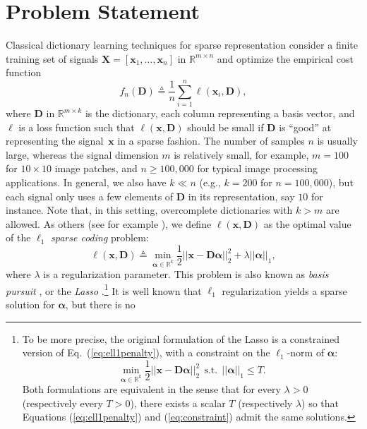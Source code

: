 \documentclass[twoside,11pt]{article}
\def\x{{\mathbf x}}
\def\l{{\ell}}
\def\X{{\mathbf X}}
\def\alphab{{\boldsymbol\alpha}}
\def\D{{\mathbf D}}
\def\Real{{\mathbb R}}
\def\st{~~\text{s.t.}~~}
\def\defin{\stackrel{\vartriangle}{=}}
\begin{document}
\section{Problem Statement} \label{sec:diclearn} 
Classical dictionary learning techniques for sparse representation \citep{field,engan,lewicki,aharon,lee}
consider a finite training set of signals $\X = [\x_1,\ldots,\x_n]$ in $\Real^{m \times n}$ 
and optimize the empirical cost function
\begin{equation}
   f_n(\D) \defin \frac{1}{n} \sum_{i=1}^n \l(\x_i,\D), \label{eq:empirical}
\end{equation}
where $\D$ in $\Real^{m \times k}$ is the dictionary, each column
representing a basis vector, and $\l$ is a loss function such that
$\l(\x,\D)$ should be small if $\D$ is ``good'' at representing the
signal~$\x$ in a sparse fashion. The number of samples
$n$ is usually large, whereas the signal dimension $m$ is relatively
small, for example, $m = 100$ for $10 \times 10$ image patches, and $n
\geq 100, 000$ for typical image processing applications.  In general,
we also have $k \ll n$ (e.g., $k=200$ for $n=100, 000$), but each
signal only uses a few elements of $\D$ in its representation, say
$10$ for instance. Note that, in this setting, overcomplete dictionaries with $k >
m$ are allowed. As others (see for example \citealp{lee}), we define
$\l(\x,\D)$ as the optimal value of the $\ell_1$ {\em sparse coding}
problem:
\begin{equation}
   \l(\x,\D) \defin \min_{\alphab \in \Real^k} \frac{1}{2}||\x-\D\alphab||_2^2 +
   \lambda ||\alphab||_1,\label{eq:ell1penalty}
\end{equation}
where $\lambda$ is a regularization parameter. 
This problem is also known as {\em basis pursuit} \citep{chen}, or the {\em
Lasso} \citep{tibshirani}.\footnote{To be more precise, the original formulation
of the Lasso is a constrained version of Eq.~(\ref{eq:ell1penalty}), with a
constraint on the $\ell_1$-norm of $\alphab$:
\begin{equation}
\min_{\alphab \in \Real^k} \frac{1}{2}||\x-\D\alphab||_2^2 \st ||\alphab||_1 \leq T.\label{eq:constraint}
\end{equation}
Both formulations are equivalent in the sense that for every $\lambda > 0$ (respectively every $T > 0$), there exists
a scalar $T$ (respectively $\lambda$) so that Equations (\ref{eq:ell1penalty}) and (\ref{eq:constraint}) admit
the same solutions.
 } It is well known that 
$\ell_1$ regularization yields a sparse solution for $\alphab$, but there is no
\end{document}
